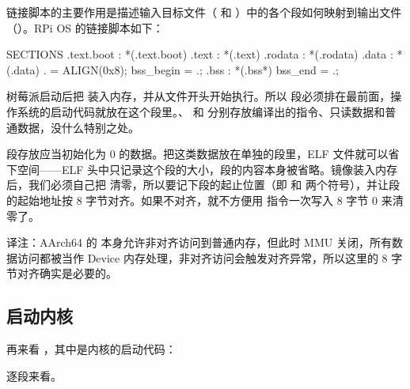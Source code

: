 链接脚本的主要作用是描述输入目标文件（ 和 ）中的各个段如何映射到输出文件（）。RPi OS 的链接脚本如下：

\begin{txtcode}
SECTIONS
{
	.text.boot : { *(.text.boot) }
	.text : { *(.text) }
	.rodata : { *(.rodata) }
	.data : { *(.data) }
	. = ALIGN(0x8);
	bss_begin = .;
	.bss : { *(.bss*) }
	bss_end = .;
}
\end{txtcode}

树莓派启动后把  装入内存，并从文件开头开始执行。所以  段必须排在最前面，操作系统的启动代码就放在这个段里。、 和  分别存放编译出的指令、只读数据和普通数据，没什么特别之处。

 段存放应当初始化为 0 的数据。把这类数据放在单独的段里，ELF 文件就可以省下空间——ELF 头中只记录这个段的大小，段的内容本身被省略。镜像装入内存后，我们必须自己把  清零，所以要记下段的起止位置（即  和  两个符号），并让段的起始地址按 8 字节对齐。如果不对齐，就不方便用  指令一次写入 8 字节 0 来清零了。

\begin{remark}
  译注：AArch64 的  本身允许非对齐访问到普通内存，但此时 MMU 关闭，所有数据访问都被当作 Device 内存处理，非对齐访问会触发对齐异常，所以这里的 8 字节对齐确实是必要的。
\end{remark}

\subsection{启动内核}

再来看 ，其中是内核的启动代码：


逐段来看。

